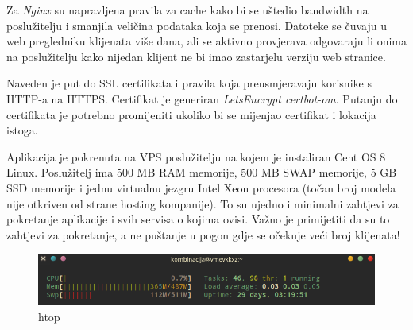 		Za  \textit{Nginx} su napravljena pravila za cache kako bi se uštedio bandwidth na poslužitelju i smanjila veličina podataka koja se prenosi. Datoteke se čuvaju u web pregledniku klijenata više dana, ali se aktivno provjerava odgovaraju li onima na poslužitelju kako nijedan klijent ne bi imao zastarjelu verziju web stranice.
		
		Naveden je put do SSL certifikata i pravila koja preusmjeravaju korisnike s HTTP-a na HTTPS. Certifikat je generiran  \textit{LetsEncrypt certbot-om}. Putanju do certifikata je potrebno promijeniti ukoliko bi se mijenjao certifikat i lokacija istoga.\\
		
		
		Aplikacija je pokrenuta na VPS poslužitelju na kojem je instaliran Cent OS 8 Linux. Poslužitelj ima 500 MB RAM memorije, 500 MB SWAP memorije, 5 GB SSD memorije i jednu virtualnu jezgru Intel Xeon procesora (točan broj modela nije otkriven od strane hosting kompanije). To su ujedno i minimalni zahtjevi za pokretanje aplikacije i svih servisa o kojima ovisi. Važno je primijetiti da su to zahtjevi za pokretanje, a ne puštanje u pogon gdje se očekuje veći broj klijenata!
		
		\begin{figure}[H]
					\includegraphics[scale=0.8]{figures/7-htop.PNG}
					\centering
					\caption{htop}
					\label{fig:htop}
				\end{figure} 
		
		\eject 
